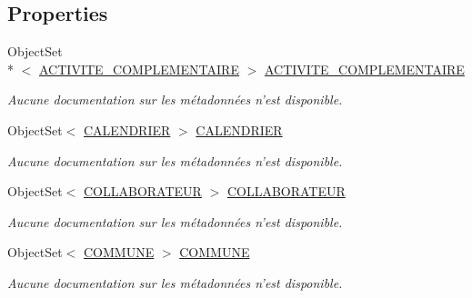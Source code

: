 \subsection*{Properties}
\begin{DoxyCompactItemize}
\item 
Object\-Set\\*
$<$ \hyperlink{class_model_1_1_a_c_t_i_v_i_t_e___c_o_m_p_l_e_m_e_n_t_a_i_r_e}{A\-C\-T\-I\-V\-I\-T\-E\-\_\-\-C\-O\-M\-P\-L\-E\-M\-E\-N\-T\-A\-I\-R\-E} $>$ \hyperlink{class_model_1_1_b_d_d___s_i_o7_entities_a709b82c58993d3301d8fb850ff569654}{A\-C\-T\-I\-V\-I\-T\-E\-\_\-\-C\-O\-M\-P\-L\-E\-M\-E\-N\-T\-A\-I\-R\-E}
\begin{DoxyCompactList}\small\item\em Aucune documentation sur les métadonnées n'est disponible. \end{DoxyCompactList}\item 
Object\-Set$<$ \hyperlink{class_model_1_1_c_a_l_e_n_d_r_i_e_r}{C\-A\-L\-E\-N\-D\-R\-I\-E\-R} $>$ \hyperlink{class_model_1_1_b_d_d___s_i_o7_entities_af6cdc5ecd7668ffe0331bcf663733351}{C\-A\-L\-E\-N\-D\-R\-I\-E\-R}
\begin{DoxyCompactList}\small\item\em Aucune documentation sur les métadonnées n'est disponible. \end{DoxyCompactList}\item 
Object\-Set$<$ \hyperlink{class_model_1_1_c_o_l_l_a_b_o_r_a_t_e_u_r}{C\-O\-L\-L\-A\-B\-O\-R\-A\-T\-E\-U\-R} $>$ \hyperlink{class_model_1_1_b_d_d___s_i_o7_entities_a40ce35269025503e79db707928e426cb}{C\-O\-L\-L\-A\-B\-O\-R\-A\-T\-E\-U\-R}
\begin{DoxyCompactList}\small\item\em Aucune documentation sur les métadonnées n'est disponible. \end{DoxyCompactList}\item 
Object\-Set$<$ \hyperlink{class_model_1_1_c_o_m_m_u_n_e}{C\-O\-M\-M\-U\-N\-E} $>$ \hyperlink{class_model_1_1_b_d_d___s_i_o7_entities_abae02e6727c53ad93c03d782dc106fb4}{C\-O\-M\-M\-U\-N\-E}
\begin{DoxyCompactList}\small\item\em Aucune documentation sur les métadonnées n'est disponible. \end{DoxyCompactList}\item 

\end{DoxyCompactItemize}
